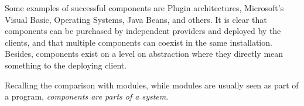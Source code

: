 Some examples of successful components are Plugin architectures, Microsoft's Visual Basic, Operating Systems, Java Beans, and others.
It is clear that components can be purchased by independent providers and deployed by the clients, and that multiple components can coexist in the same installation.
Besides, components exist on a level on abstraction where they directly mean something to the deploying client.
\nl

Recalling the comparison with modules,
while modules are usually seen as part of a program, \textit{components are parts of a system}.

